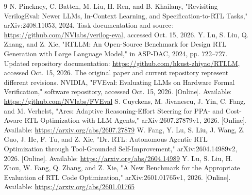 \documentclass[conference,10pt]{IEEEtran}
\begin{document}
\clearpage
\begin{thebibliography}{9}
N. Pinckney, C. Batten, M. Liu, H. Ren, and B. Khailany, "Revisiting VerilogEval: Newer LLMs, In-Context Learning, and Specification-to-RTL Tasks," arXiv:2408.11053, 2024. Task documentation and source: \url{https://github.com/NVlabs/verilog-eval}, accessed Oct. 15, 2026.
Y. Lu, S. Liu, Q. Zhang, and Z. Xie, "RTLLM: An Open-Source Benchmark for Design RTL Generation with Large Language Model," in ASP-DAC, 2024, pp. 722--727. Updated repository documentation: \url{https://github.com/hkust-zhiyao/RTLLM}, accessed Oct. 15, 2026. The original paper and current repository represent different revisions.
NVIDIA, "FVEval: Evaluating LLMs on Hardware Formal Verification," software repository, accessed Oct. 15, 2026. [Online]. Available: \url{https://github.com/NVlabs/FVEval}
S. Cuyckens, M. Jivanescu, J. Yin, C. Fang, and M. Verhelst, "Ares: Adaptive Reasoning-Effort Steering for PPA- and Cost-Aware RTL Optimization with LLM Agents," arXiv:2607.27879v1, 2026. [Online]. Available: \url{https://arxiv.org/abs/2607.27879}
W. Fang, Y. Lu, S. Liu, J. Wang, Z. Guo, J. He, F. Tu, and Z. Xie, "Dr. RTL: Autonomous Agentic RTL Optimization through Tool-Grounded Self-Improvement," arXiv:2604.14989v2, 2026. [Online]. Available: \url{https://arxiv.org/abs/2604.14989}
Y. Lu, S. Liu, H. Zhou, W. Fang, Q. Zhang, and Z. Xie, "A New Benchmark for the Appropriate Evaluation of RTL Code Optimization," arXiv:2601.01765v1, 2026. [Online]. Available: \url{https://arxiv.org/abs/2601.01765}
\end{thebibliography}
\end{document}
